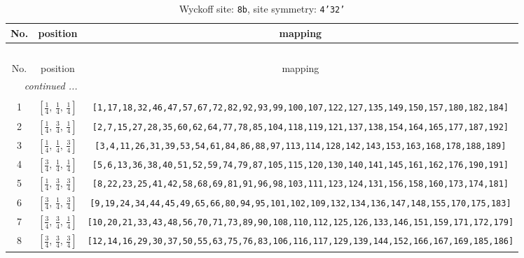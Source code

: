 \documentclass[fleqn,8pt]{jsarticle}
\begin{document}
\renewcommand{\arraystretch}{1.2}
\begin{longtable}{ccc}
\caption{Wyckoff site: {\tt 8b}, site symmetry: {\tt 4'32'}}
 \\
 \hline \hline
No. & position & mapping \\ \hline \endfirsthead

\multicolumn{2}{l}{\tablename\ \thetable{}} \\
 \hline \hline
No. & position & mapping \\ \hline \endhead

 \hline \hline
\multicolumn{2}{r}{\footnotesize\it continued ...} \\ \endfoot

 \hline \hline
\multicolumn{2}{r}{} \\ \endlastfoot

1 & $\left[ \frac{1}{4},\, \frac{1}{4},\, \frac{1}{4} \right]$ & {\tt [1,17,18,32,46,47,57,67,72,82,92,93,99,100,107,122,127,135,149,150,157,180,182,184]} \\ \hline
2 & $\left[ \frac{1}{4},\, \frac{3}{4},\, \frac{1}{4} \right]$ & {\tt [2,7,15,27,28,35,60,62,64,77,78,85,104,118,119,121,137,138,154,164,165,177,187,192]} \\ \hline
3 & $\left[ \frac{1}{4},\, \frac{1}{4},\, \frac{3}{4} \right]$ & {\tt [3,4,11,26,31,39,53,54,61,84,86,88,97,113,114,128,142,143,153,163,168,178,188,189]} \\ \hline
4 & $\left[ \frac{3}{4},\, \frac{1}{4},\, \frac{1}{4} \right]$ & {\tt [5,6,13,36,38,40,51,52,59,74,79,87,105,115,120,130,140,141,145,161,162,176,190,191]} \\ \hline
5 & $\left[ \frac{1}{4},\, \frac{3}{4},\, \frac{3}{4} \right]$ & {\tt [8,22,23,25,41,42,58,68,69,81,91,96,98,103,111,123,124,131,156,158,160,173,174,181]} \\ \hline
6 & $\left[ \frac{3}{4},\, \frac{1}{4},\, \frac{3}{4} \right]$ & {\tt [9,19,24,34,44,45,49,65,66,80,94,95,101,102,109,132,134,136,147,148,155,170,175,183]} \\ \hline
7 & $\left[ \frac{3}{4},\, \frac{3}{4},\, \frac{1}{4} \right]$ & {\tt [10,20,21,33,43,48,56,70,71,73,89,90,108,110,112,125,126,133,146,151,159,171,172,179]} \\ \hline
8 & $\left[ \frac{3}{4},\, \frac{3}{4},\, \frac{3}{4} \right]$ & {\tt [12,14,16,29,30,37,50,55,63,75,76,83,106,116,117,129,139,144,152,166,167,169,185,186]} \\
\end{longtable}
\renewcommand{\arraystretch}{1.2}
\end{document}
